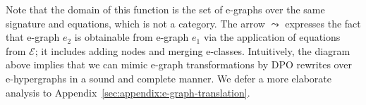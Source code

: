 Note that the domain of this function is the set of e-graphs over the same signature and equations, which is not a category.
The arrow $\leadsto$ expresses the fact that e-graph $e_2$ is obtainable from e-graph $e_1$ via the application of equations from $\mathcal{E}$; it includes adding nodes and merging e-classes.
Intuitively, the diagram above implies that we can mimic e-graph transformations by DPO rewrites over e-hypergraphs in a sound and complete manner.
We defer a more elaborate analysis to Appendix~\ref{sec:appendix:e-graph-translation}.
